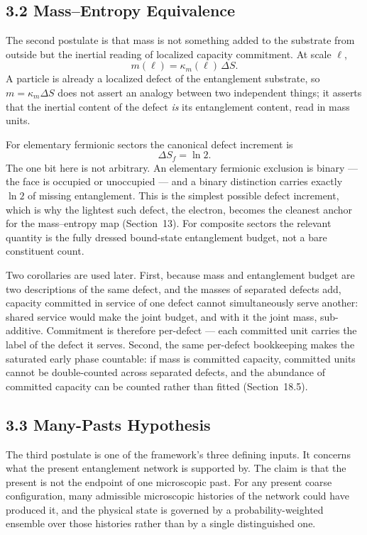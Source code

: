 \documentclass[11pt]{article}
\begin{document}
\subsection{3.2 Mass--Entropy Equivalence}

The second postulate is that mass is not something added to the substrate from outside but the inertial reading of localized capacity commitment. At scale $\ell$,
\[
m(\ell)=\kappa_m(\ell)\,\Delta S.
\]
A particle is already a localized defect of the entanglement substrate, so $m=\kappa_m\Delta S$ does not assert an analogy between two independent things; it asserts that the inertial content of the defect \emph{is} its entanglement content, read in mass units.

For elementary fermionic sectors the canonical defect increment is
\[
\Delta S_f=\ln 2.
\]
The one bit here is not arbitrary. An elementary fermionic exclusion is binary --- the face is occupied or unoccupied --- and a binary distinction carries exactly $\ln 2$ of missing entanglement. This is the simplest possible defect increment, which is why the lightest such defect, the electron, becomes the cleanest anchor for the mass--entropy map (Section~13). For composite sectors the relevant quantity is the fully dressed bound-state entanglement budget, not a bare constituent count.

Two corollaries are used later. First, because mass and entanglement budget are two descriptions of the same defect, and the masses of separated defects add, capacity committed in service of one defect cannot simultaneously serve another: shared service would make the joint budget, and with it the joint mass, sub-additive. Commitment is therefore per-defect --- each committed unit carries the label of the defect it serves. Second, the same per-defect bookkeeping makes the saturated early phase countable: if mass is committed capacity, committed units cannot be double-counted across separated defects, and the abundance of committed capacity can be counted rather than fitted (Section~18.5).

\subsection{3.3 Many-Pasts Hypothesis}

The third postulate is one of the framework's three defining inputs. It concerns what the present entanglement network is supported by. The claim is that the present is not the endpoint of one microscopic past. For any present coarse configuration, many admissible microscopic histories of the network could have produced it, and the physical state is governed by a probability-weighted ensemble over those histories rather than by a single distinguished one.
\end{document}
